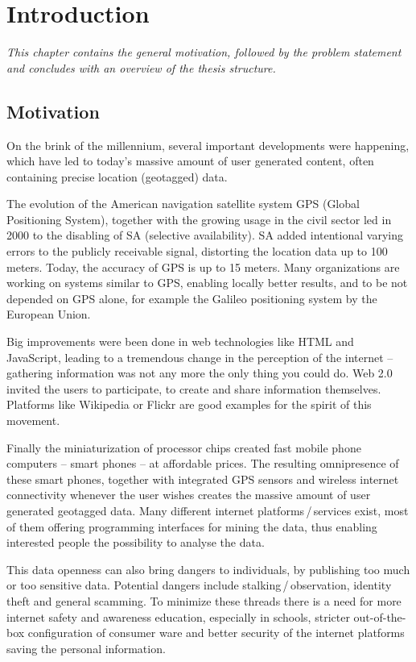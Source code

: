 
\chapter{Introduction}
\emph{%
This chapter contains the general motivation, followed by the problem statement and concludes with an overview of the thesis structure.
}\label{chap:intro}
%

\section{Motivation}
On the brink of the millennium, several important developments were happening, which have led to today's massive amount of user generated content, often containing precise location (geotagged) data.

The evolution of the American navigation satellite system GPS (Global Positioning System), together with the growing usage in the civil sector led in 2000 to the disabling of SA (selective availability). SA added intentional varying errors to the publicly receivable signal, distorting the location data up to 100 meters.
Today, the accuracy of GPS is up to 15 meters. Many organizations are working on systems similar to GPS, enabling locally better results, and to be not depended on GPS alone, for example the Galileo positioning system by the European Union.

Big improvements were been done in web technologies like HTML and JavaScript, leading to a tremendous change in the perception of the internet -- gathering information was not any more the only thing you could do. Web 2.0 invited the users to participate, to create and share information themselves. Platforms like Wikipedia or Flickr are good examples for the spirit of this movement. 

Finally the miniaturization of processor chips created fast mobile phone computers -- smart phones -- at affordable prices. The resulting omnipresence of these smart phones, together with integrated GPS sensors and wireless internet connectivity whenever the user wishes creates the massive amount of user generated geotagged data. Many different internet platforms\,/\,services exist, most of them offering programming interfaces for mining the data, thus enabling interested people the possibility to analyse the data. 

This data openness can also bring dangers to individuals, by publishing too much or too sensitive data. Potential dangers include stalking\,/\,observation, identity theft and general scamming. To minimize these threads there is a need for more internet safety and awareness education, especially in schools, stricter out-of-the-box configuration of consumer ware and better security of the internet platforms saving the personal information.

